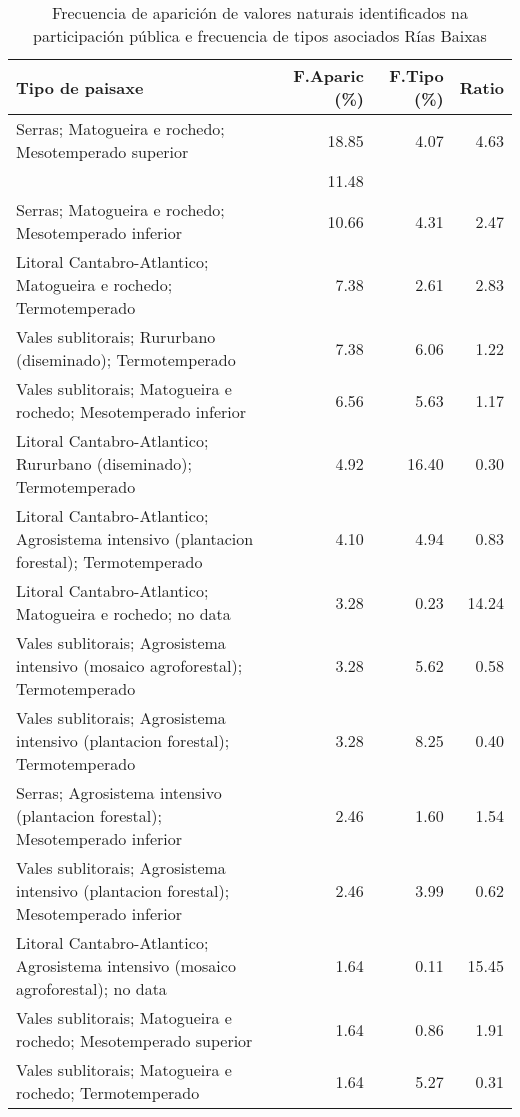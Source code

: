 \begin{table}[p]
\centering
\caption{Frecuencia de aparición de valores naturais identificados na participación pública e frecuencia de tipos asociados Rías Baixas} 
\label{vsixotnat12}
\begin{tabular}{lrrr}
  \hline
Tipo de paisaxe & F.Aparic (\%) & F.Tipo (\%) & Ratio \\ 
  \hline
Serras; Matogueira e rochedo; Mesotemperado superior & 18.85 & 4.07 & 4.63 \\ 
   & 11.48 &  &  \\ 
  Serras; Matogueira e rochedo; Mesotemperado inferior & 10.66 & 4.31 & 2.47 \\ 
  Litoral Cantabro-Atlantico; Matogueira e rochedo; Termotemperado & 7.38 & 2.61 & 2.83 \\ 
  Vales sublitorais; Rururbano (diseminado); Termotemperado & 7.38 & 6.06 & 1.22 \\ 
  Vales sublitorais; Matogueira e rochedo; Mesotemperado inferior & 6.56 & 5.63 & 1.17 \\ 
  Litoral Cantabro-Atlantico; Rururbano (diseminado); Termotemperado & 4.92 & 16.40 & 0.30 \\ 
  Litoral Cantabro-Atlantico; Agrosistema intensivo (plantacion forestal); Termotemperado & 4.10 & 4.94 & 0.83 \\ 
  Litoral Cantabro-Atlantico; Matogueira e rochedo; no data & 3.28 & 0.23 & 14.24 \\ 
  Vales sublitorais; Agrosistema intensivo (mosaico agroforestal); Termotemperado & 3.28 & 5.62 & 0.58 \\ 
  Vales sublitorais; Agrosistema intensivo (plantacion forestal); Termotemperado & 3.28 & 8.25 & 0.40 \\ 
  Serras; Agrosistema intensivo (plantacion forestal); Mesotemperado inferior & 2.46 & 1.60 & 1.54 \\ 
  Vales sublitorais; Agrosistema intensivo (plantacion forestal); Mesotemperado inferior & 2.46 & 3.99 & 0.62 \\ 
  Litoral Cantabro-Atlantico; Agrosistema intensivo (mosaico agroforestal); no data & 1.64 & 0.11 & 15.45 \\ 
  Vales sublitorais; Matogueira e rochedo; Mesotemperado superior & 1.64 & 0.86 & 1.91 \\ 
  Vales sublitorais; Matogueira e rochedo; Termotemperado & 1.64 & 5.27 & 0.31 \\ 
   \hline
\end{tabular}
\end{table}
